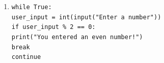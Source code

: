 \documentclass{article}
\begin{document}
\begin{enumerate}
\begin{multicols}{2}
\begin{enumerate}
		\null\quad\texttt{if user\_input \% 2 == 1:}\\
			\null\quad\quad\texttt{continue}\\
			\null\quad\texttt{print("You entered an even number!")}\\
			\texttt{}\\
	\item \texttt{while True:}\\
	\null\quad\texttt{user\_input = int(input("Enter a number"))}\\
	\null\quad\texttt{if user\_input \% 2 == 0:}\\
		\null\quad\quad\texttt{print("You entered an even number!")}\\
		\null\quad\quad\texttt{break}\\
		\null\quad\texttt{continue}\\
		\null\quad\quad\texttt{}\\
\end{enumerate}
\end{multicols}
\end{enumerate}
\end{document}

